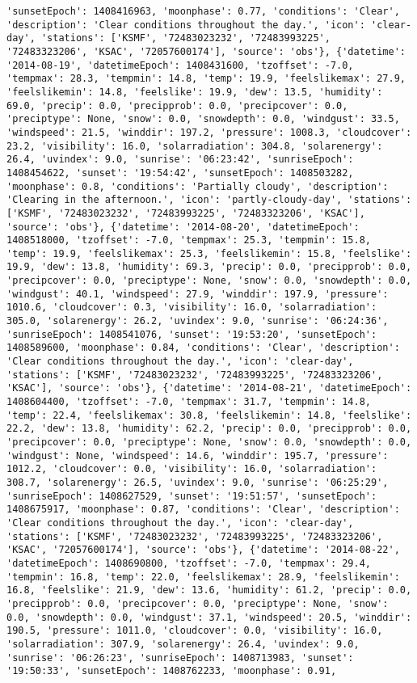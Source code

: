 \documentclass[
  letterpaper,
  DIV=11,
  numbers=noendperiod]{scrartcl}
\begin{document}
\begin{verbatim}
'sunsetEpoch': 1408416963, 'moonphase': 0.77, 'conditions': 'Clear', 'description': 'Clear conditions throughout the day.', 'icon': 'clear-day', 'stations': ['KSMF', '72483023232', '72483993225', '72483323206', 'KSAC', '72057600174'], 'source': 'obs'}, {'datetime': '2014-08-19', 'datetimeEpoch': 1408431600, 'tzoffset': -7.0, 'tempmax': 28.3, 'tempmin': 14.8, 'temp': 19.9, 'feelslikemax': 27.9, 'feelslikemin': 14.8, 'feelslike': 19.9, 'dew': 13.5, 'humidity': 69.0, 'precip': 0.0, 'precipprob': 0.0, 'precipcover': 0.0, 'preciptype': None, 'snow': 0.0, 'snowdepth': 0.0, 'windgust': 33.5, 'windspeed': 21.5, 'winddir': 197.2, 'pressure': 1008.3, 'cloudcover': 23.2, 'visibility': 16.0, 'solarradiation': 304.8, 'solarenergy': 26.4, 'uvindex': 9.0, 'sunrise': '06:23:42', 'sunriseEpoch': 1408454622, 'sunset': '19:54:42', 'sunsetEpoch': 1408503282, 'moonphase': 0.8, 'conditions': 'Partially cloudy', 'description': 'Clearing in the afternoon.', 'icon': 'partly-cloudy-day', 'stations': ['KSMF', '72483023232', '72483993225', '72483323206', 'KSAC'], 'source': 'obs'}, {'datetime': '2014-08-20', 'datetimeEpoch': 1408518000, 'tzoffset': -7.0, 'tempmax': 25.3, 'tempmin': 15.8, 'temp': 19.9, 'feelslikemax': 25.3, 'feelslikemin': 15.8, 'feelslike': 19.9, 'dew': 13.8, 'humidity': 69.3, 'precip': 0.0, 'precipprob': 0.0, 'precipcover': 0.0, 'preciptype': None, 'snow': 0.0, 'snowdepth': 0.0, 'windgust': 40.1, 'windspeed': 27.9, 'winddir': 197.9, 'pressure': 1010.6, 'cloudcover': 0.3, 'visibility': 16.0, 'solarradiation': 305.0, 'solarenergy': 26.2, 'uvindex': 9.0, 'sunrise': '06:24:36', 'sunriseEpoch': 1408541076, 'sunset': '19:53:20', 'sunsetEpoch': 1408589600, 'moonphase': 0.84, 'conditions': 'Clear', 'description': 'Clear conditions throughout the day.', 'icon': 'clear-day', 'stations': ['KSMF', '72483023232', '72483993225', '72483323206', 'KSAC'], 'source': 'obs'}, {'datetime': '2014-08-21', 'datetimeEpoch': 1408604400, 'tzoffset': -7.0, 'tempmax': 31.7, 'tempmin': 14.8, 'temp': 22.4, 'feelslikemax': 30.8, 'feelslikemin': 14.8, 'feelslike': 22.2, 'dew': 13.8, 'humidity': 62.2, 'precip': 0.0, 'precipprob': 0.0, 'precipcover': 0.0, 'preciptype': None, 'snow': 0.0, 'snowdepth': 0.0, 'windgust': None, 'windspeed': 14.6, 'winddir': 195.7, 'pressure': 1012.2, 'cloudcover': 0.0, 'visibility': 16.0, 'solarradiation': 308.7, 'solarenergy': 26.5, 'uvindex': 9.0, 'sunrise': '06:25:29', 'sunriseEpoch': 1408627529, 'sunset': '19:51:57', 'sunsetEpoch': 1408675917, 'moonphase': 0.87, 'conditions': 'Clear', 'description': 'Clear conditions throughout the day.', 'icon': 'clear-day', 'stations': ['KSMF', '72483023232', '72483993225', '72483323206', 'KSAC', '72057600174'], 'source': 'obs'}, {'datetime': '2014-08-22', 'datetimeEpoch': 1408690800, 'tzoffset': -7.0, 'tempmax': 29.4, 'tempmin': 16.8, 'temp': 22.0, 'feelslikemax': 28.9, 'feelslikemin': 16.8, 'feelslike': 21.9, 'dew': 13.6, 'humidity': 61.2, 'precip': 0.0, 'precipprob': 0.0, 'precipcover': 0.0, 'preciptype': None, 'snow': 0.0, 'snowdepth': 0.0, 'windgust': 37.1, 'windspeed': 20.5, 'winddir': 190.5, 'pressure': 1011.0, 'cloudcover': 0.0, 'visibility': 16.0, 'solarradiation': 307.9, 'solarenergy': 26.4, 'uvindex': 9.0, 'sunrise': '06:26:23', 'sunriseEpoch': 1408713983, 'sunset': '19:50:33', 'sunsetEpoch': 1408762233, 'moonphase': 0.91, 
\end{verbatim}
\end{document}

